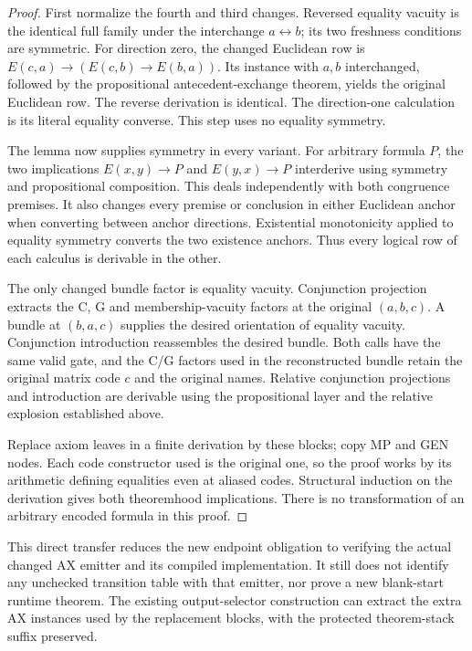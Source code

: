 \begin{proof}
First normalize the fourth and third changes.  Reversed equality
vacuity is the identical full family under the interchange
$a\leftrightarrow b$; its two freshness conditions are symmetric.
For direction zero, the changed Euclidean row is
$E(c,a)\to(E(c,b)\to E(b,a))$.  Its instance with $a,b$
interchanged, followed by the propositional antecedent-exchange
theorem, yields the original Euclidean row.  The reverse derivation
is identical.  The direction-one calculation is its literal
equality converse.  This step uses no equality symmetry.

The lemma now supplies symmetry in every variant.  For arbitrary
formula $P$, the two implications $E(x,y)\to P$ and
$E(y,x)\to P$ interderive using symmetry and propositional
composition.  This deals independently with both congruence
premises.  It also changes every premise or conclusion in either
Euclidean anchor when converting between anchor directions.
Existential monotonicity applied to equality symmetry converts
the two existence anchors.  Thus every logical row of each
calculus is derivable in the other.

The only changed bundle factor is equality vacuity.  Conjunction
projection extracts the C, G and membership-vacuity factors at
the original $(a,b,c)$.  A bundle at $(b,a,c)$ supplies the desired
orientation of equality vacuity.  Conjunction introduction
reassembles the desired bundle.  Both calls have the same valid
gate, and the C/G factors used in the reconstructed bundle retain
the original matrix code $c$ and the original names.  Relative
conjunction projections and introduction are derivable using the
propositional layer and the relative explosion established above.

Replace axiom leaves in a finite derivation by these blocks; copy
MP and GEN nodes.  Each code constructor used is the original
one, so the proof works by its arithmetic defining equalities
even at aliased codes.  Structural induction on the derivation
gives both theoremhood implications.  There is no transformation
of an arbitrary encoded formula in this proof.
\end{proof}

This direct transfer reduces the new endpoint obligation to
verifying the actual changed AX emitter and its compiled
implementation.  It still does not identify any unchecked
transition table with that emitter, nor prove a new blank-start
runtime theorem.  The existing output-selector construction can
extract the extra AX instances used by the replacement blocks,
with the protected theorem-stack suffix preserved.

